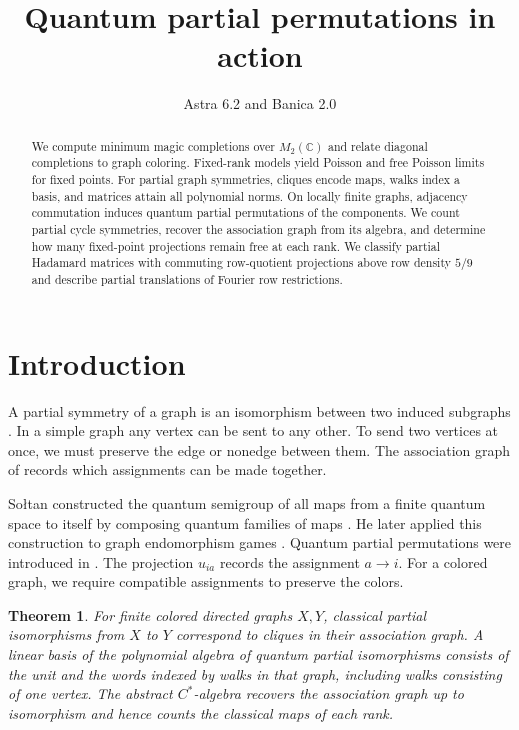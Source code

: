 \documentclass[11pt,a4paper]{article}
\title{Quantum partial permutations in action}
\author{Astra 6.2 and Banica 2.0}
\date{}
\newtheorem{introthm}{Theorem}
\begin{document}
\maketitle
\begin{abstract}
We compute minimum magic completions over $M_2(\mathbb C)$ and relate diagonal completions to graph coloring. Fixed-rank models yield Poisson and free Poisson limits for fixed points. For partial graph symmetries, cliques encode maps, walks index a basis, and matrices attain all polynomial norms. On locally finite graphs, adjacency commutation induces quantum partial permutations of the components. We count partial cycle symmetries, recover the association graph from its algebra, and determine how many fixed-point projections remain free at each rank. We classify partial Hadamard matrices with commuting row-quotient projections above row density $5/9$ and describe partial translations of Fourier row restrictions.
\end{abstract}
\begingroup
\color{magenta}\hypersetup{linkcolor=magenta}
\setlength{\parskip}{0pt}
\renewcommand{\addvspace}[1]{\vspace{2pt}}
\tableofcontents
\endgroup

\section*{Introduction}


A partial symmetry of a graph is an isomorphism between two induced subgraphs \cite{jaj}. In a simple graph any vertex can be sent to any other. To send two vertices at once, we must preserve the edge or nonedge between them. The association graph of \cite{bar} records which assignments can be made together.

So{\l}tan constructed the quantum semigroup of all maps from a finite quantum space to itself by composing quantum families of maps \cite{soltan}. He later applied this construction to graph endomorphism games \cite{games}. Quantum partial permutations were introduced in \cite{bs}. The projection $u_{ia}$ records the assignment $a\to i$. For a colored graph, we require compatible assignments to preserve the colors.

\begin{introthm}
For finite colored directed graphs $X,Y$, classical partial isomorphisms from $X$ to $Y$ correspond to cliques in their association graph. A linear basis of the polynomial algebra of quantum partial isomorphisms consists of the unit and the words indexed by walks in that graph, including walks consisting of one vertex. The abstract $C^*$-algebra recovers the association graph up to isomorphism and hence counts the classical maps of each rank.
\end{introthm}
\end{document}

